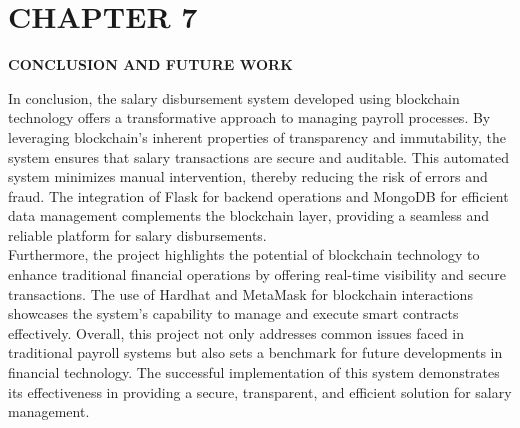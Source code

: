 \documentclass[12pt]{report}
\begin{document}
\newpage
\vspace{10em}
\section*{}
\vspace{1EM}
\begin{center}
    \textbf{\fontsize{16pt}{21.6pt}\selectfont }  %
\end{center}
\begin{center}
    \justify
\end{center}
\newpage
\setcounter{page}{18}
\section*{CHAPTER 7}
\vspace{1em}
\begin{center}
    \textbf{\fontsize{16pt}{21.6pt}\selectfont CONCLUSION AND FUTURE WORK}
\end{center}
\begin{center}
    \justify
In conclusion, the salary disbursement system developed using blockchain technology offers a transformative approach to managing payroll processes. By leveraging blockchain’s inherent properties of transparency and immutability, the system ensures that salary transactions are secure and auditable. This automated system minimizes manual intervention, thereby reducing the risk of errors and fraud. The integration of Flask for backend operations and MongoDB for efficient data management complements the blockchain layer, providing a seamless and reliable platform for salary disbursements.\\
Furthermore, the project highlights the potential of blockchain technology to enhance traditional financial operations by offering real-time visibility and secure transactions. The use of Hardhat and MetaMask for blockchain interactions showcases the system’s capability to manage and execute smart contracts effectively. Overall, this project not only addresses common issues faced in traditional payroll systems but also sets a benchmark for future developments in financial technology. The successful implementation of this system demonstrates its effectiveness in providing a secure, transparent, and efficient solution for salary management.

\end{center}
\end{document}

